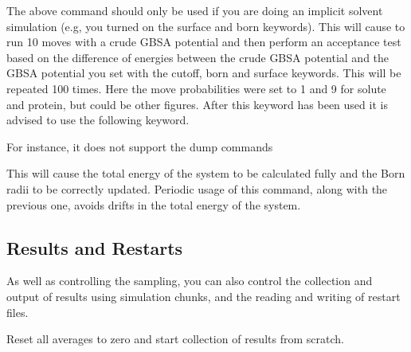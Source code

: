 \documentclass[letterpaper,10pt,english]{sphinxmanual}
\begin{document}
The above command should only be used if you are doing an implicit solvent simulation (e.g, you turned on the surface and born keywords). This will cause to run 10 moves with a crude GBSA potential and then perform an acceptance test based on the difference of energies between the crude GBSA potential and the GBSA potential you set with the cutoff, born and surface keywords. This will be repeated 100 times. Here the move probabilities were set to 1 and 9 for solute and protein, but could be other figures. After this keyword has been used it is advised to use the following keyword.

 For instance, it does not support the dump commands

\ignorespaces 
\def\sphinxLiteralBlockLabel{\label{\detokenize{protoms:index-72}}}
%
\begin{sphinxVerbatim}[commandchars=\\\{\}]
 
\end{sphinxVerbatim}

This will cause the total energy of the system to be calculated fully and the Born radii to be correctly updated. Periodic usage of this command, along with the previous one, avoids drifts in the total energy of the system.


\subsection{Results and Restarts}
\label{\detokenize{protoms:results-and-restarts}}
As well as controlling the sampling, you can also control the collection and output of results using simulation chunks, and the reading and writing of restart files.

\ignorespaces 
\def\sphinxLiteralBlockLabel{\label{\detokenize{protoms:index-73}}}
%
\begin{sphinxVerbatim}[commandchars=\\\{\}]
  
\end{sphinxVerbatim}

Reset all averages to zero and start collection of results from scratch.

%
\begin{sphinxVerbatim}[commandchars=\\\{\}]
  
\end{sphinxVerbatim}
\end{document}
